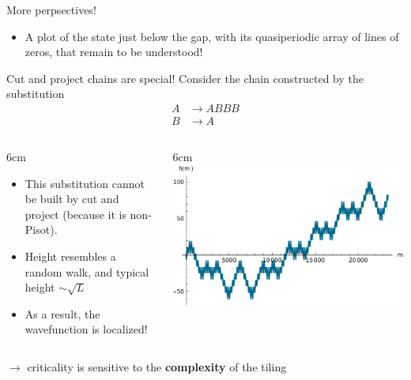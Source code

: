 \documentclass[xcolor=x11names,compress,professionalfonts, aspectratio=169]{beamer}
\renewcommand{\(}{\begin{columns}}
\renewcommand{\)}{\end{columns}}
\newcommand{\<}[1]{\begin{column}{#1}}
\renewcommand{\>}{\end{column}}
\begin{document}
\begin{frame}{More perpsectives!}
\begin{itemize}
	\item A plot of the state just below the gap, with its quasiperiodic array of lines of zeros, that remain to be understood!
\end{itemize}
\end{frame}

\begin{frame}{Cut and project chains are special!}
Consider the chain constructed by the substitution
\begin{align*}
	A & \to ABBB \\
	B & \to A
\end{align*}
\begin{columns}
\<{6cm}
\begin{itemize}
	\item This substitution cannot be built by cut and project (because it is non-Pisot).
	\item Height resembles a random walk, and typical height $\sim \sqrt{L}$
	\item As a result, the wavefunction is localized! 
\end{itemize}
\>
\<{6cm}
\includegraphics[scale=.5]{img/heightsB3.pdf}
\>
\end{columns}
$\rightarrow$ criticality is sensitive to the \textbf{complexity} of the tiling
\end{frame}
\end{document}
